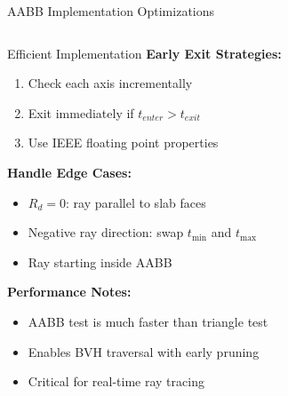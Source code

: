 \begin{frame}{AABB Implementation Optimizations}
    \begin{columns}
        \begin{column}{0.6\textwidth}
            \begin{conceptbox}{Efficient Implementation}
                \textbf{Early Exit Strategies:}
                \begin{enumerate}
                    \item Check each axis incrementally
                    \item Exit immediately if $t_{enter} > t_{exit}$
                    \item Use IEEE floating point properties
                \end{enumerate}
                
                \vspace{0.3cm}
                \textbf{Handle Edge Cases:}
                \begin{itemize}
                    \item $R_d = 0$: ray parallel to slab faces
                    \item Negative ray direction: swap $t_{\text{min}}$ and $t_{\text{max}}$
                    \item Ray starting inside AABB
                \end{itemize}
                
                \vspace{0.3cm}
                \textbf{Performance Notes:}
                \begin{itemize}
                    \item AABB test is \alert{much faster} than triangle test
                    \item Enables BVH traversal with early pruning
                    \item Critical for real-time ray tracing
                \end{itemize}
            \end{conceptbox}
        \end{column}
        \begin{column}{0.4\textwidth}
\end{column}
\end{columns}
\end{frame}
